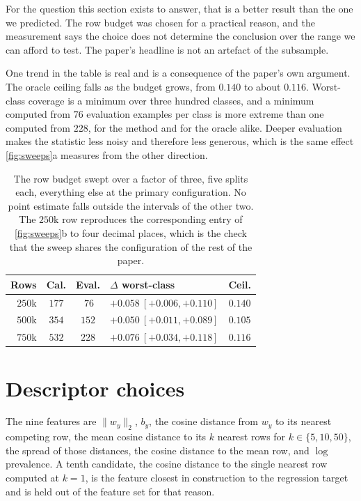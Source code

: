 For the question this section exists to answer, that is a better result than the one we
predicted. The row budget was chosen for a practical reason, and the measurement says the
choice does not determine the conclusion over the range we can afford to test. The paper's
headline is not an artefact of the subsample.

One trend in the table is real and is a consequence of the paper's own argument. The oracle
ceiling falls as the budget grows, from $0.140$ to about $0.116$. Worst-class coverage is a
minimum over three hundred classes, and a minimum computed from $76$ evaluation examples per
class is more extreme than one computed from $228$, for the method and for the oracle alike.
Deeper evaluation makes the statistic less noisy and therefore less generous, which is the
same effect \cref{fig:sweeps}a measures from the other direction.

\begin{table}[h]
\centering
\small
\setlength{\tabcolsep}{3pt}
\begin{tabular}{@{}rcclc@{}}
\toprule
Rows & Cal. & Eval. & $\Delta$ worst-class & Ceil. \\
\midrule
$250$k & $177$ & $\ 76$ & $+0.058\ [+0.006,+0.110]$ & $0.140$ \\
$500$k & $354$ & $152$ & $+0.050\ [+0.011,+0.089]$ & $0.105$ \\
$750$k & $532$ & $228$ & $+0.076\ [+0.034,+0.118]$ & $0.116$ \\
\bottomrule
\end{tabular}
\caption{The row budget swept over a factor of three, five splits each, everything else at the
primary configuration. No point estimate falls outside the intervals of the other two. The
$250$k row reproduces the corresponding entry of \cref{fig:sweeps}b to four decimal places,
which is the check that the sweep shares the configuration of the rest of the paper.}
\label{tab:rowbudget}
\end{table}

\section{Descriptor choices}
\label{app:descriptors}

The nine features are $\|w_y\|_2$, $b_y$, the cosine distance from $w_y$ to its nearest
competing row, the mean cosine distance to its $k$ nearest rows for $k\in\{5,10,50\}$, the
spread of those distances, the cosine distance to the mean row, and $\log$ prevalence. A tenth
candidate, the cosine distance to the single nearest row computed at $k=1$, is the feature
closest in construction to the regression target and is held out of the feature set for that
reason.


